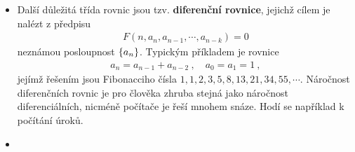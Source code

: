 \begin{itemize}
    \item Další důležitá třída rovnic jsou tzv. \textbf{diferenční rovnice}, jejichž cílem je nalézt z předpisu \begin{align}
        F(n, a_n, a_{n-1}, \cdots , a_{n-k}) = 0
    \end{align}
    neznámou posloupnost $\left \lbrace a_n \right \rbrace$. Typickým příkladem je rovnice \begin{align}
        a_{n} = a_{n-1} + a_{n-2} \:, \quad a_0 = a_1 = 1 \:,
    \end{align}
    jejímž řešením jsou Fibonacciho čísla $1,1,2,3,5,8,13,21,34,55,\cdots$. Náročnost diferenčních rovnic je pro člověka zhruba stejná jako náročnost diferenciálních, nicméně počítače je řeší mnohem snáze. Hodí se například k počítání úroků. 

    \item 
\end{itemize}

